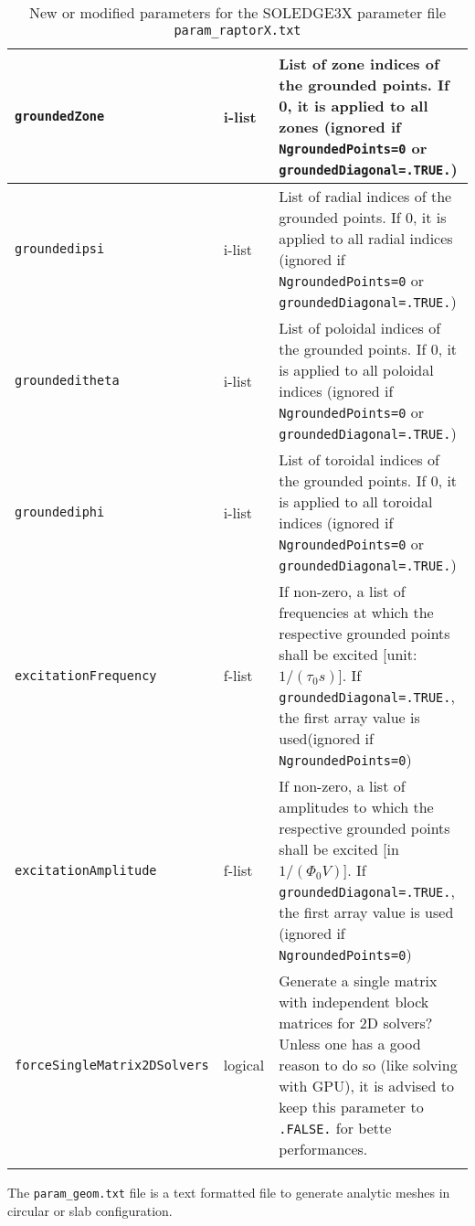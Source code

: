 \begin{longtable}[!h]{>{\raggedright\arraybackslash}p{}p{}>{\raggedright\arraybackslash}p{}}
	\\ \hline
	\texttt{groundedZone} & i-list & List of zone indices of the grounded points. If 0, it is applied to all zones (ignored if \texttt{NgroundedPoints=0} or \texttt{groundedDiagonal=.TRUE.})
	\\ \hline
	\texttt{groundedipsi} & i-list & List of radial indices of the grounded points. If 0, it is applied to all radial indices (ignored if \texttt{NgroundedPoints=0} or \texttt{groundedDiagonal=.TRUE.})
	\\ \hline
	\texttt{groundeditheta} & i-list & List of poloidal indices of the grounded points. If 0, it is applied to all poloidal indices (ignored if \texttt{NgroundedPoints=0} or \texttt{groundedDiagonal=.TRUE.})
	\\ \hline
	\texttt{groundediphi} & i-list & List of toroidal indices of the grounded points. If 0, it is applied to all toroidal indices (ignored if \texttt{NgroundedPoints=0} or \texttt{groundedDiagonal=.TRUE.})
	\\ \hline
	\texttt{excitationFrequency} & f-list  & If non-zero, a list of frequencies at which the respective grounded points shall be excited [unit: $1/(\tau_0s)$]. If \texttt{groundedDiagonal=.TRUE.}, the first array value is used(ignored if \texttt{NgroundedPoints=0})
	\\ \hline
	\texttt{excitationAmplitude} & f-list  & If non-zero, a list of amplitudes to which the respective grounded points shall be excited [in $1/(\Phi_0 V)$]. If \texttt{groundedDiagonal=.TRUE.}, the first array value is used (ignored if \texttt{NgroundedPoints=0})
	\\ \hline
	\texttt{forceSingleMatrix2DSolvers} & logical & Generate a single matrix with independent block matrices for 2D solvers? Unless one has a good reason to do so (like solving with GPU), it is advised to keep this parameter to \texttt{.FALSE.} for bette performances.
	\\ \hline
   \caption[New or modified parameters for the SOLEDGE3X parameter file.]{New or modified parameters for the SOLEDGE3X parameter file \\ \texttt{param\_raptorX.txt}}
\end{longtable}

The \texttt{param\_geom.txt} file is a text formatted file to generate analytic meshes in circular or slab configuration.

